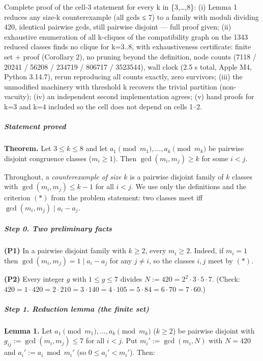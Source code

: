 
Complete proof of the cell-3 statement for every k in \{3,\ldots,8\}:
(i) Lemma 1 reduces any size-k counterexample (all gcds ≤ 7) to a family
with moduli dividing 420, identical pairwise gcds, still pairwise
disjoint --- full proof given; (ii) exhaustive enumeration of all
k-cliques of the compatibility graph on the 1343 reduced classes finds
no clique for k=3..8, with exhaustiveness certificate: finite set +
proof (Corollary 2), no pruning beyond the definition, node counts (7118
/ 20241 / 56208 / 234719 / 806717 / 3523544), wall clock (2.5 s total,
Apple M4, Python 3.14.7), rerun reproducing all counts exactly, zero
survivors; (iii) the unmodified machinery with threshold k recovers the
trivial partition (non-vacuity); (iv) an independent second
implementation agrees; (v) hand proofs for k=3 and k=4 included so the
cell does not depend on cells 1--2.


\subparagraph{Statement proved}\label{statement-proved}

\textbf{Theorem.} Let \(3 \le k \le 8\) and let
\(a_1 \pmod{m_1},\dots,a_k \pmod{m_k}\) be pairwise disjoint congruence
classes (\(m_i\ge 1\)). Then \(\gcd(m_i,m_j)\ge k\) for some \(i<j\).

Throughout, a \emph{counterexample of size \(k\)} is a pairwise disjoint
family of \(k\) classes with \(\gcd(m_i,m_j)\le k-1\) for all \(i<j\).
We use only the definitions and the criterion \((*)\) from the problem
statement: two classes meet iff \(\gcd(m_i,m_j)\mid a_i-a_j\).

\subparagraph{Step 0. Two preliminary
facts}\label{step-0.-two-preliminary-facts}

\textbf{(P1)} In a pairwise disjoint family with \(k\ge2\), every
\(m_i\ge 2\). Indeed, if \(m_i=1\) then \(\gcd(m_i,m_j)=1\mid a_i-a_j\)
for any \(j\neq i\), so the classes \(i,j\) meet by \((*)\).

\textbf{(P2)} Every integer \(g\) with \(1\le g\le 7\) divides
\(N:=420=2^2\cdot3\cdot5\cdot7\). (Check:
\(420=1\cdot420=2\cdot210=3\cdot140=4\cdot105=5\cdot84=6\cdot70=7\cdot60\).)

\subparagraph{Step 1. Reduction lemma (the finite
set)}\label{step-1.-reduction-lemma-the-finite-set}

\textbf{Lemma 1.} Let \(a_1 \pmod{m_1},\dots,a_k \pmod{m_k}\)
(\(k\ge2\)) be pairwise disjoint with \(g_{ij}:=\gcd(m_i,m_j)\le 7\) for
all \(i<j\). Put \(m_i':=\gcd(m_i,N)\) with \(N=420\) and
\(a_i':=a_i \bmod m_i'\) (so \(0\le a_i'<m_i'\)). Then:

